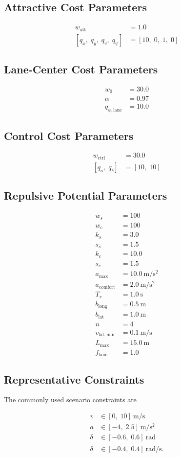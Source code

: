 \documentclass[11pt]{article}
\begin{document}
\subsection{Attractive Cost Parameters}

\begin{align}
w_{\mathrm{att}} &= 1.0 \\
[q_x,\; q_y,\; q_v,\; q_{\psi}] &= [10,\; 0,\; 1,\; 0]
\end{align}

\subsection{Lane-Center Cost Parameters}

\begin{align}
w_0 &= 30.0 \\
\alpha &= 0.97 \\
q_{\psi,\mathrm{lane}} &= 10.0
\end{align}

\subsection{Control Cost Parameters}

\begin{align}
w_{\mathrm{ctrl}} &= 30.0 \\
[q_a,\; q_{\delta}] &= [10,\; 10]
\end{align}

\subsection{Repulsive Potential Parameters}

\begin{align}
w_s &= 100 \\
w_c &= 100 \\
k_s &= 3.0 \\
s_s &= 1.5 \\
k_c &= 10.0 \\
s_c &= 1.5 \\
a_{\max} &= 10.0~\mathrm{m/s^2} \\
a_{\mathrm{comfort}} &= 2.0~\mathrm{m/s^2} \\
T_r &= 1.0~\mathrm{s} \\
b_{\mathrm{long}} &= 0.5~\mathrm{m} \\
b_{\mathrm{lat}} &= 1.0~\mathrm{m} \\
n &= 4 \\
v_{\mathrm{lat,min}} &= 0.1~\mathrm{m/s} \\
L_{\max} &= 15.0~\mathrm{m} \\
f_{\mathrm{lane}} &= 1.0
\end{align}

\subsection{Representative Constraints}

The commonly used scenario constraints are

\begin{align}
v &\in [0,\; 10]~\mathrm{m/s} \\
a &\in [-4,\; 2.5]~\mathrm{m/s^2} \\
\delta &\in [-0.6,\; 0.6]~\mathrm{rad} \\
\dot{\delta} &\in [-0.4,\; 0.4]~\mathrm{rad/s}.
\end{align}
\end{document}
